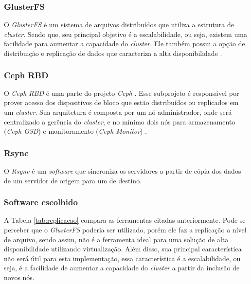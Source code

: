 \subsubsection{GlusterFS}
\label{section:glusterfs}
O \textit{GlusterFS} \cite{glusterfs} é um sistema de arquivos distribuídos que utiliza a estrutura de \textit{cluster}. Sendo que, seu principal
objetivo é a escalabilidade, ou seja, existem uma facilidade para aumentar a capacidade do \textit{cluster}.
Ele também possui a opção de distribuição e replicação de dados que caracteriza a alta disponibilidade \cite{glusterfs}.

\subsubsection{Ceph RBD}
\label{section:cephrbd}
O \textit{Ceph RBD} \cite{cephrbd} é uma parte do projeto \textit{Ceph} \cite{ceph}. Esse subprojeto é responsável por prover acesso dos 
dispositivos de bloco que estão distribuídos ou replicados em um \textit{cluster}. Sua arquitetura é composta por um nó administrador, onde será
centralizado a gerência do \textit{cluster}, e no mínimo dois nós para armazenamento (\textit{Ceph OSD}) e monitoramento (\textit{Ceph Monitor})
\cite{ceph}.

\subsubsection{Rsync}
\label{section:rsync}
O \textit{Rsync} \cite{rsync} é um \textit{software} que sincroniza os servidores a partir de cópia dos dados de um servidor de origem 
para um de destino.


\subsubsection{Software escolhido}
\label{section:replicacaoescolhido}

A Tabela \ref{tab:replicacao} compara as ferramentas citadas anteriormente. Pode-se perceber que o \textit{GlusterFS} poderia ser utilizado, 
porém ele faz a replicação a nível de arquivo, sendo assim, não é a ferramenta ideal para uma solução de alta disponibilidade utilizando 
virtualização. Além disso, sua principal característica não será útil para esta implementação, essa característica é a escalabilidade, ou seja, 
é a facilidade de aumentar a capacidade do \textit{cluster} a partir da inclusão de novos nós.

